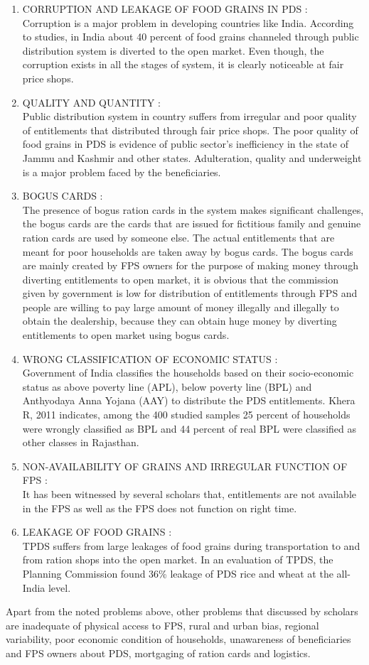 \documentclass{article}
\begin{document}
\begin{enumerate}
\item CORRUPTION AND LEAKAGE OF FOOD GRAINS IN PDS : \\
Corruption is a major problem in developing countries like India. According to studies, in India about 40 percent of food grains channeled through public distribution system is diverted to the open market. Even though, the corruption exists in all the stages of system, it is clearly noticeable at fair price shops.
\item QUALITY AND QUANTITY : \\
Public distribution system in country suffers from irregular and poor quality of entitlements that distributed through fair price shops. The poor quality of food grains in PDS is evidence of public sector’s inefficiency in the state of Jammu and Kashmir and other states. Adulteration, quality and underweight is a major problem faced by the beneficiaries.
\item BOGUS CARDS : \\
The presence of bogus ration cards in the system makes significant challenges, the bogus cards are the cards that are issued for fictitious family and genuine ration cards are used by someone else. The actual entitlements that are meant for poor households are taken away by bogus cards. The bogus cards are mainly created by FPS owners for the purpose of making money through diverting entitlements to open market, it is obvious that the commission given by government is low for distribution of entitlements through FPS and people are willing to pay large amount of money illegally and illegally to obtain the dealership, because they can obtain huge money by diverting entitlements to open market using bogus cards.
\item WRONG CLASSIFICATION OF ECONOMIC STATUS : \\
Government of India classifies the households based on their socio-economic status as above poverty line (APL), below poverty line (BPL) and Anthyodaya Anna Yojana (AAY) to distribute the PDS entitlements. Khera R, 2011 indicates, among the 400 studied samples 25 percent of households were wrongly classified as BPL and 44 percent of real BPL were classified as other classes in Rajasthan.
\item NON-AVAILABILITY OF GRAINS AND IRREGULAR FUNCTION OF FPS : \\
It has been witnessed by several scholars that, entitlements are not available in the FPS as well as the FPS does not function on right time.
\item LEAKAGE OF FOOD GRAINS : \\
TPDS suffers from large leakages of food grains during transportation to and from ration shops into the open market.  In an evaluation of TPDS, the Planning Commission found 36\% leakage of PDS rice and wheat at the all-India level.
\end{enumerate}
Apart from the noted problems above, other problems that discussed by scholars are inadequate of physical access to FPS, rural and urban bias, regional variability, poor economic condition of households, unawareness of beneficiaries and FPS owners about PDS, mortgaging of ration cards and logistics.
\end{document}
